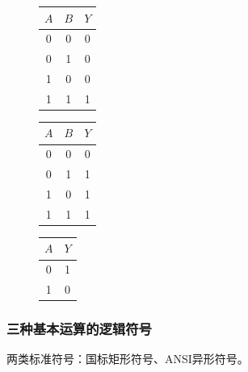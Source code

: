 \begin{figure}[!htbp]
    \centering
    \begin{minipage}{0.3\textwidth}
        \centering
        \begin{tabular}{|c|c|c|}
            \hline
            $A$ & $B$ & $Y$ \\
            \hline
            0 & 0 & 0 \\
            0 & 1 & 0 \\
            1 & 0 & 0 \\
            1 & 1 & 1 \\
            \hline
        \end{tabular}
    \end{minipage}
    \hfill
    \begin{minipage}{0.3\textwidth}
        \centering
        \begin{tabular}{|c|c|c|}
            \hline
            $A$ & $B$ & $Y$ \\
            \hline
            0 & 0 & 0 \\
            0 & 1 & 1 \\
            1 & 0 & 1 \\
            1 & 1 & 1 \\
            \hline
        \end{tabular}
    \end{minipage}
    \hfill
    \begin{minipage}{0.3\textwidth}
        \centering
        \begin{tabular}{|c|c|}
            \hline
            $A$ & $Y$ \\
            \hline
            0 & 1 \\
            1 & 0 \\
            \hline
        \end{tabular}
    \end{minipage}
\end{figure}

\subsubsection{三种基本运算的逻辑符号}
两类标准符号：国标矩形符号、ANSI异形符号。

